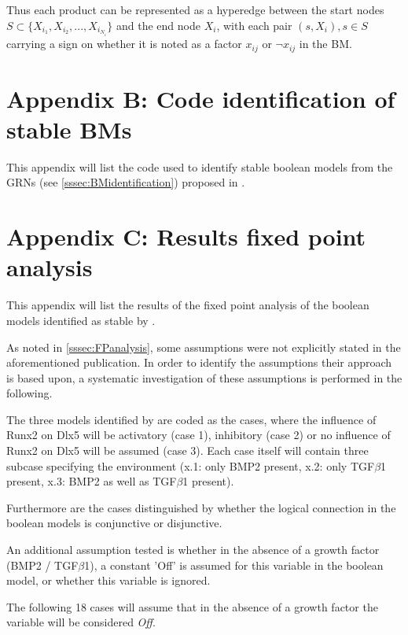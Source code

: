 \documentclass[11pt]{article}
\begin{document}
\begin{appendices}
Thus each product can be represented  as a hyperedge between the start nodes $ S \subset \{X_{i_{1}}, X_{i_{2}},..., X_{i_{N_{i}}}\}$ and the end node $X_{i}$, with each pair $(s, X_{i}), s \in S$ carrying a sign on whether it is noted as a factor $x_{ij}$ or $\neg x_{ij}$ in the BM.

\section*{Appendix B: Code identification of stable BMs} \label{AppendixB}
This appendix will list the code used to identify stable boolean models from the GRNs (see \ref{sssec:BMidentification}) proposed in \cite{Kirkham}.


\section*{Appendix C: Results fixed point analysis} \label{AppendixC}
This appendix will list the results of the fixed point analysis of the boolean models identified as stable by \cite{Kirkham}.

As noted in \ref{sssec:FPanalysis}, some assumptions were not explicitly stated in the aforementioned publication. In order to identify the assumptions their approach is based upon, a systematic investigation of these assumptions is performed in the following. 

The three models identified by \cite{Kirkham} are coded as the cases, where the influence of Runx2 on Dlx5 will be activatory (case 1), inhibitory (case 2) or no influence of Runx2 on Dlx5 will be assumed (case 3).
Each case itself will contain three subcase specifying the environment (x.1: only BMP2 present, x.2: only TGF$\beta$1 present, x.3: BMP2 as well as TGF$\beta$1 present).

Furthermore are the cases distinguished by whether the logical connection in the boolean models is conjunctive or disjunctive.

An additional assumption tested is whether in the absence of a growth factor (BMP2 / TGF$\beta$1), a constant 'Off' is assumed for this variable in the boolean model, or whether this variable is ignored.

The following 18 cases will assume that in the absence of a growth factor the variable will be considered \textit{Off}. \\


\end{appendices}
\end{document}
